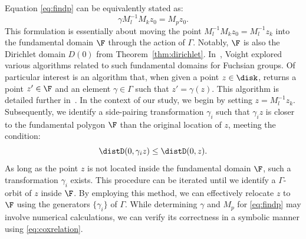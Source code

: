 Equation \eqref{eq:findp} can be equivalently stated as:
\[
\gamma M_l^{-1}M_kz_0 = M_p z_0.
\]
This formulation is essentially about moving the point $M_l^{-1}M_kz_0 = M_l^{-1}z_k$ into the fundamental domain $\F$ through the action of $\Gamma$.
Notably, $\F$ is also the Dirichlet domain $D(0)$ from Theorem~\ref{thm:dirichlet}.
In~\cite{MR2541438}, Voight explored various algorithms related to such fundamental domains for Fuchsian groups.
Of particular interest is an algorithm that, when given a point \(z \in \disk\), returns a point \(z' \in \F\) and an element \(\gamma \in \Gamma\) such that \(z' = \gamma(z)\). 
This algorithm is detailed further in~\cite[Algorithm 4.3]{MR2541438}.
In the context of our study, we begin by setting \(z = M_l^{-1}z_k\).
Subsequently, we identify a side-pairing transformation \(\gamma_i\) such that \(\gamma_i z\) is closer to the fundamental polygon \(\F\) than the original location of \(z\), meeting the condition:
\[
\distD(0, \gamma_i z) \leq \distD(0, z).
\]
As long as the point $z$ is not located inside the fundamental domain $\F$, such a transformation \(\gamma_i\) exists.
This procedure can be iterated until we identify a \(\Gamma\)-orbit of \(z\) inside \(\F\).
By employing this method, we can effectively relocate $z$ to $\F$ using the generators $\{\gamma_i\}$ of $\Gamma$.
While determining \(\gamma\) and \(M_p\) for \eqref{eq:findp} may involve numerical calculations, we can verify its correctness in a symbolic manner using \eqref{eq:coxrelation}.

